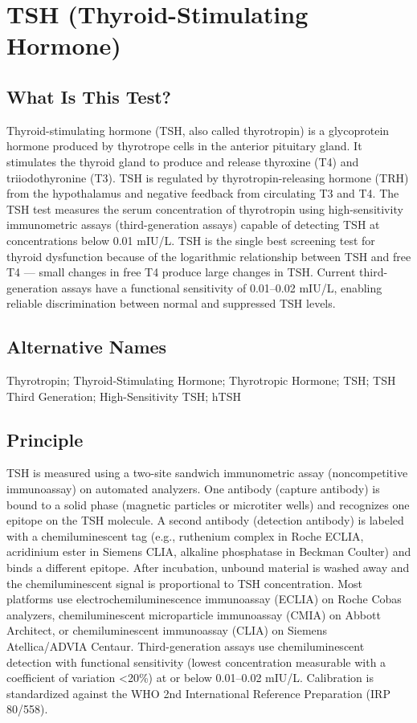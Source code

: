 \chapter{TSH (Thyroid-Stimulating Hormone)}

\section*{What Is This Test?}
Thyroid-stimulating hormone (TSH, also called thyrotropin) is a glycoprotein hormone produced by thyrotrope cells in the anterior pituitary gland. It stimulates the thyroid gland to produce and release thyroxine (T4) and triiodothyronine (T3). TSH is regulated by thyrotropin-releasing hormone (TRH) from the hypothalamus and negative feedback from circulating T3 and T4. The TSH test measures the serum concentration of thyrotropin using high-sensitivity immunometric assays (third-generation assays) capable of detecting TSH at concentrations below 0.01 mIU/L. TSH is the single best screening test for thyroid dysfunction because of the logarithmic relationship between TSH and free T4 --- small changes in free T4 produce large changes in TSH. Current third-generation assays have a functional sensitivity of 0.01--0.02 mIU/L, enabling reliable discrimination between normal and suppressed TSH levels.

\section*{Alternative Names}
Thyrotropin; Thyroid-Stimulating Hormone; Thyrotropic Hormone; TSH; TSH Third Generation; High-Sensitivity TSH; hTSH

\section*{Principle}
TSH is measured using a two-site sandwich immunometric assay (noncompetitive immunoassay) on automated analyzers. One antibody (capture antibody) is bound to a solid phase (magnetic particles or microtiter wells) and recognizes one epitope on the TSH molecule. A second antibody (detection antibody) is labeled with a chemiluminescent tag (e.g., ruthenium complex in Roche ECLIA, acridinium ester in Siemens CLIA, alkaline phosphatase in Beckman Coulter) and binds a different epitope. After incubation, unbound material is washed away and the chemiluminescent signal is proportional to TSH concentration. Most platforms use electrochemiluminescence immunoassay (ECLIA) on Roche Cobas analyzers, chemiluminescent microparticle immunoassay (CMIA) on Abbott Architect, or chemiluminescent immunoassay (CLIA) on Siemens Atellica/ADVIA Centaur. Third-generation assays use chemiluminescent detection with functional sensitivity (lowest concentration measurable with a coefficient of variation <20\%) at or below 0.01--0.02 mIU/L. Calibration is standardized against the WHO 2nd International Reference Preparation (IRP 80/558).

